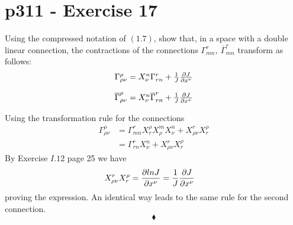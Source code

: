 \section{p311 - Exercise 17}
\begin{tcolorbox}
Using the compressed notation of $\mathbf{(1.7)}$, show that, in a  space with a double linear connection, the contractions of the connections $\Gamma^r_{mn}, \ \overline{\Gamma}^r_{mn}$ transform as follows:
$$\begin{matrix}
\Gamma^{\rho}_{\rho\nu}= X^{n}_{\nu}\Gamma^r_{rn}+ \frac{1}{J}\pdv{J}{x^{\nu}}\\\\
\overline{\Gamma}^{\rho}_{\rho\nu}= X^{n}_{\nu}\overline{\Gamma}^r_{rn}+ \frac{1}{J}\pdv{J}{x^{\nu}}
\end{matrix}$$
\end{tcolorbox}
Using the transformation rule for the connections
\begin{align*}
\Gamma^{\rho}_{\rho\nu} &=  \Gamma^r_{mn}X^{\rho}_{r}X^{m}_{\rho}X^{n}_{\nu}+X^{r}_{\rho \nu}X^{\rho}_{r}\\
&=  \Gamma^r_{rn}X^{n}_{\nu}+X^{r}_{\rho \nu}X^{\rho}_{r}
\end{align*}
By Exercise $I.12$ page 25 we have
 \begin{align*}
X^{r}_{\rho \nu}X^{\rho}_{r}&= \pdv{ln J}{x^{\nu}}= \frac{1}{J}\pdv{J}{x^{\nu}}
\end{align*}
proving the expression. An identical way leads to the same rule for the second connection.
$$\blacklozenge$$
\newpage




